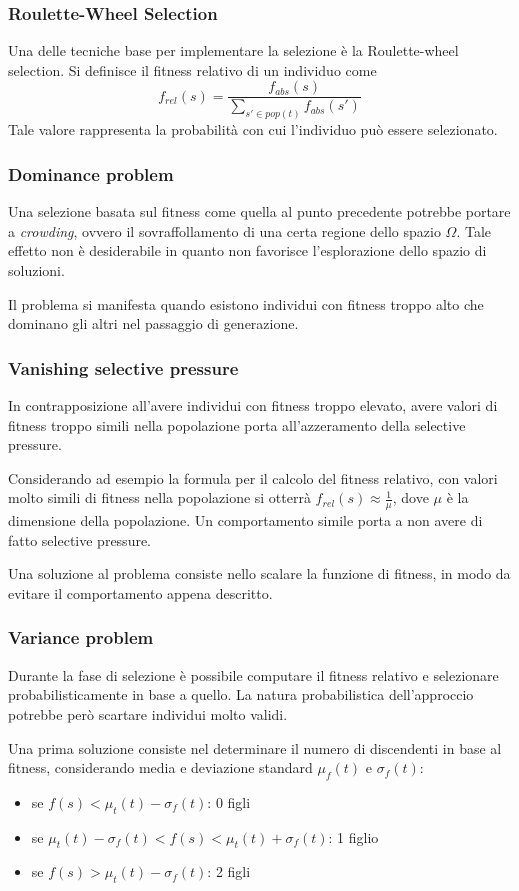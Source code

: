 \documentclass[a4paper]{article}
\begin{document}
\subsubsection{Roulette-Wheel Selection}
Una delle tecniche base per implementare la selezione è la Roulette-wheel selection.
Si definisce il fitness relativo di un individuo come 
$$ 
f_{rel}(s) = \frac{f_{abs}(s)}{\sum_{s\prime\in pop(t)} f_{abs}(s\prime)}
$$
Tale valore rappresenta la probabilità con cui l'individuo può essere selezionato.

\subsubsection{Dominance problem}
Una selezione basata sul fitness come quella al punto precedente potrebbe portare a \emph{crowding}, ovvero
il sovraffollamento di una certa regione dello spazio $\Omega$.
Tale effetto non è desiderabile in quanto non favorisce l'esplorazione dello spazio di soluzioni.

Il problema si manifesta quando esistono individui con fitness troppo alto che dominano gli altri
nel passaggio di generazione.

\subsubsection{Vanishing selective pressure}
In contrapposizione all'avere individui con fitness troppo elevato, 
avere valori di fitness troppo simili nella popolazione porta all'azzeramento della selective pressure.

Considerando ad esempio la formula per il calcolo del fitness relativo, 
con valori molto simili di fitness nella popolazione si otterrà $f_{rel}(s) \approx \frac{1}{\mu}$, 
dove $\mu$ è la dimensione della popolazione.
Un comportamento simile porta a non avere di fatto selective pressure.

Una soluzione al problema consiste nello scalare la funzione di fitness, in 
modo da evitare il comportamento appena descritto.

\subsubsection{Variance problem}
Durante la fase di selezione è possibile computare il fitness relativo e selezionare 
probabilisticamente in base a quello.
La natura probabilistica dell'approccio potrebbe però scartare individui molto validi.

Una prima soluzione consiste nel determinare il numero di discendenti in base 
al fitness, considerando media e deviazione standard $\mu_f(t)$ e $\sigma_f(t)$:
\begin{itemize}
    \item se $f(s) < \mu_t(t) - \sigma_f(t)$: 0 figli
    \item se $\mu_t(t) - \sigma_f(t) < f(s) < \mu_t(t) + \sigma_f(t)$: 1 figlio
    \item se $f(s) > \mu_t(t) - \sigma_f(t)$: 2 figli
\end{itemize} 
\end{document}
